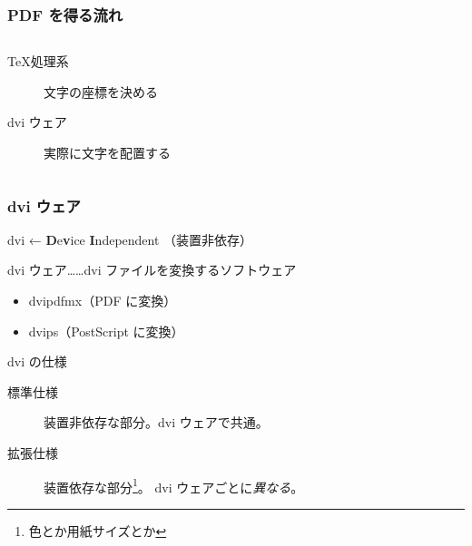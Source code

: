\begin{frame}
	\frametitle{PDF を得る流れ}
	\begin{columns}[c]
		\begin{column}{0.6\textwidth}
			\begin{description}
				\item[\TeX 処理系] 文字の座標を決める
				\item[dvi ウェア] 実際に文字を配置する
			\end{description}
		\end{column}
		\begin{column}{0.4\textwidth}
			\centering
		\end{column}
	\end{columns}
\end{frame}

\begin{frame}
	\frametitle{dvi ウェア}
	dvi ← \textbf{D}e\textbf{v}ice \textbf{I}ndependent （装置非依存）
	
	dvi ウェア……dvi ファイルを変換するソフトウェア
	
	\begin{itemize}
		\item dvipdfmx（PDF に変換）
		\item dvips（PostScript に変換）
	\end{itemize}
	
	\begin{block}{dvi の仕様}
		\begin{description}
			\item[標準仕様] 装置非依存な部分。dvi ウェアで共通。
			\item[拡張仕様] 装置依存な部分\footnote{色とか用紙サイズとか}。
				dvi ウェアごとに\emph{異なる}。
		\end{description}
	\end{block}
\end{frame}

